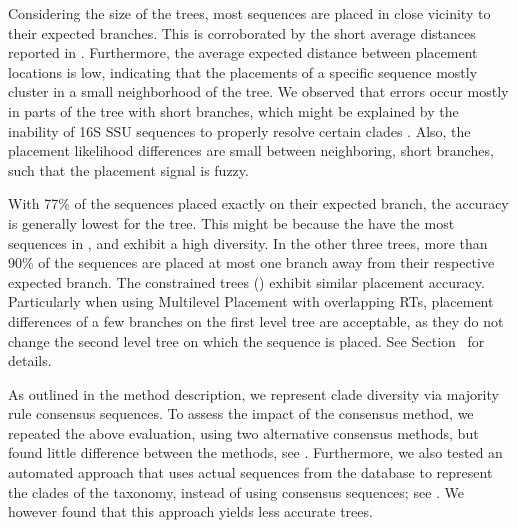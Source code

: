 Considering the size of the trees, most sequences are placed in close vicinity to their expected branches.
This is corroborated by the short average distances reported in .
Furthermore, the average expected distance between placement locations \citep[EDPL,][]{Matsen2010} is low,
indicating that the placements of a specific sequence mostly cluster in a small neighborhood of the tree.
We observed that errors occur mostly in parts of the tree with short branches,
which might be explained by the inability of 16S SSU sequences to properly resolve certain clades \citep{Janda2007}.
Also, the placement likelihood differences are small between neighboring, short branches,
such that the placement signal is fuzzy.

With 77\% of the sequences placed exactly on their expected branch,
the accuracy is generally lowest for the  tree.
This might be because the  have the most sequences in , and exhibit a high diversity.
In the other three trees, more than 90\% of the sequences are placed
at most one branch away from their respective expected branch.
The constrained trees () exhibit similar placement accuracy.
Particularly when using Multilevel Placement with overlapping \acp{RT},
placement differences of a few branches on the first level tree are acceptable,
as they do not change the second level tree on which the sequence is placed.
See Section~ for details.

As outlined in the method description, we represent clade diversity via majority rule consensus sequences.
To assess the impact of the consensus method, we repeated the above evaluation, using two alternative consensus methods,
but found little difference between the methods, see .
Furthermore, we also tested an automated approach
that uses actual sequences from the database to represent the clades of the taxonomy,
instead of using consensus sequences; see .
We however found that this approach yields less accurate trees.

